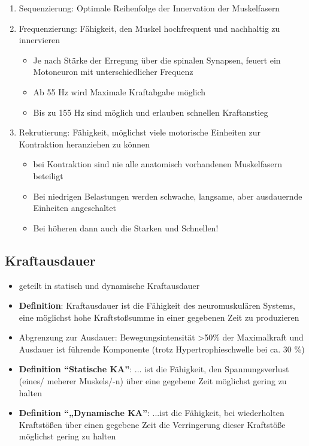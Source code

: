\begin{enumerate}
    \item Sequenzierung: Optimale Reihenfolge der Innervation der Muskelfasern
    \item Frequenzierung: Fähigkeit, den Muskel hochfrequent und nachhaltig zu innervieren
    \begin{itemize}
        \item Je nach Stärke der Erregung über die spinalen Synapsen, feuert ein Motoneuron mit unterschiedlicher Frequenz
        \item  Ab 55 Hz wird Maximale Kraftabgabe möglich
        \item  Bis zu 155 Hz sind möglich und erlauben schnellen Kraftanstieg
    \end{itemize}
    \item Rekrutierung: Fähigkeit, möglichst viele motorische Einheiten zur Kontraktion heranziehen zu können
    \begin{itemize}
        \item bei Kontraktion sind nie alle anatomisch vorhandenen Muskelfasern beteiligt
        \item Bei niedrigen Belastungen werden schwache, langsame, aber ausdauernde Einheiten angeschaltet
        \item Bei höheren dann auch die Starken und Schnellen!
    \end{itemize}
\end{enumerate}

\subsection{Kraftausdauer}

\begin{itemize}
    \item geteilt in statisch und dynamische Kraftausdauer
    \item \textbf{Definition}: Kraftausdauer ist die Fähigkeit des neuromuskulären Systems, eine möglichst hohe Kraftstoßsumme in einer gegebenen Zeit zu produzieren
    \item Abgrenzung zur Ausdauer: Bewegungsintensität >50\% der Maximalkraft und Ausdauer ist führende Komponente (trotz Hypertrophieschwelle bei ca. 30 \%)
    \item \textbf{Definition ``Statische KA''}: ... ist die Fähigkeit, den Spannungsverlust (eines/ meherer Muskels/-n) über eine gegebene Zeit möglichst gering zu halten
    \item \textbf{Definition ``„Dynamische KA''}: ...ist die Fähigkeit, bei wiederholten Kraftstößen über einen gegebene Zeit die Verringerung dieser Kraftstöße möglichst gering zu halten
\end{itemize}

